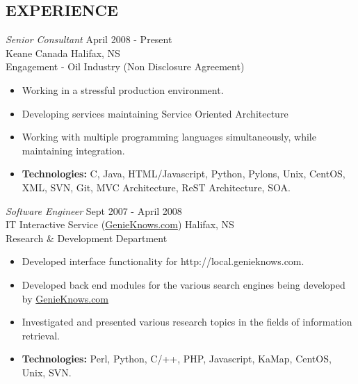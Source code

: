 \documentclass[line,margin]{res}
\begin{document}
\begin{resume}
\section{EXPERIENCE}

   {\sl Senior Consultant} \hfill April 2008 - Present \\
    Keane Canada \hfill Halifax, NS \\
    Engagement - Oil Industry (Non Disclosure Agreement) \smallskip
    \begin{itemize}  \itemsep -2pt %
     \item Working in a stressful production environment.
     \item Developing services maintaining Service Oriented Architecture
     \item Working with multiple programming languages
            simultaneously, while \\ maintaining integration.
     \item {\bf Technologies:} \hspace{1pt}
        C, Java, HTML/Javascript, Python, Pylons, Unix, CentOS, \newline
        \hspace*{72pt} XML, SVN, Git, MVC Architecture, ReST Architecture, SOA.
    \end{itemize}

   {\sl Software Engineer} \hfill Sept 2007 - April 2008 \\
    IT Interactive Service (\href{http://www.genieknows.com}{GenieKnows.com}) \hfill Halifax, NS \\
    Research {\&} Development Department \smallskip
    \begin{itemize}  \itemsep -2pt %
     \item Developed interface functionality for
             http://local.genieknows.com.
     \item Developed back end modules for the various search
             engines being developed by
             \href{http://www.genieknows.com}{GenieKnows.com}
     \item Investigated and presented various research topics
             in the fields of information retrieval.
     \item {\bf Technologies:} \hspace{1pt}
        Perl, Python, C/++, PHP, Javascript, KaMap, CentOS, \\
        \hspace*{72pt} Unix, SVN.
    \end{itemize}


\end{resume}
\end{document}
